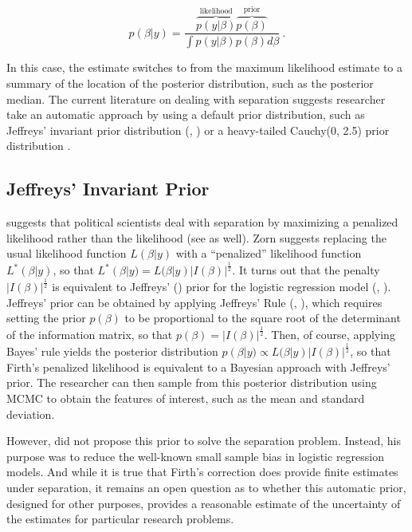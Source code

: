 \documentclass[12pt]{article}
\begin{document}
\begin{equation}\nonumber
p(\beta|y) = \dfrac{\overbrace{p(y|\beta)}^{\text{likelihood}}\overbrace{p(\beta)}^{\text{prior}}}{\int p(y|\beta)p(\beta) d\beta}~\text{.}
\end{equation}

\noindent In this case, the estimate switches to from the maximum likelihood estimate to a summary of the location of the posterior distribution, such as the posterior median. The current literature on dealing with separation suggests researcher take an automatic approach by using a default prior distribution, such as Jeffreys' invariant prior distribution (\citealt{Jeffreys1946}, \citealt{Zorn2005}) or a heavy-tailed Cauchy(0, 2.5) prior distribution \citep{Gelmanetal2008}.

\subsection*{Jeffreys' Invariant Prior}

\cite{Zorn2005} suggests that political scientists deal with separation by maximizing a penalized likelihood rather than the likelihood (see \citealt{HeinzeSchemper2002} as well). Zorn suggests replacing the usual likelihood function $L(\beta | y)$ with a ``penalized'' likelihood function $L^*(\beta | y)$, so that $L^*(\beta | y) = L(\beta | y)|I(\beta)|^\frac{1}{2}$. It turns out that the penalty $|I(\beta)|^\frac{1}{2}$ is equivalent to Jeffreys' (\citeyear{Jeffreys1946}) prior for the logistic regression model (\citealt{Firth1993}, \citealt{Poirier1994}). Jeffreys' prior can be obtained by applying Jeffreys' Rule (\citealt{Jeffreys1946}, \citealt[pp. 41-60]{BoxTaio2011}), which requires setting the prior $p(\beta)$ to be proportional to the square root of the determinant of the information matrix, so that $p(\beta) = |I(\beta)|^\frac{1}{2}$. Then, of course, applying Bayes' rule yields the posterior distribution $p(\beta | y) \propto L(\beta | y)|I(\beta)|^\frac{1}{2}$, so that Firth's penalized likelihood is equivalent to a Bayesian approach with Jeffreys' prior. The researcher can then sample from this posterior distribution using MCMC to obtain the features of interest, such as the mean and standard deviation.

However, \cite{Firth1993} did not propose this prior to solve the separation problem. Instead, his purpose was to reduce the well-known small sample bias in logistic regression models. And while it is true that Firth's correction does provide finite estimates under separation, it remains an open question as to whether this automatic prior, designed for other purposes, provides a reasonable estimate of the uncertainty of the estimates for particular research problems.
\end{document}
